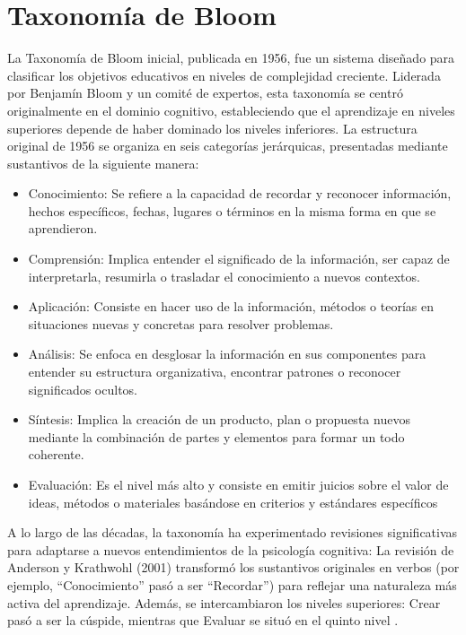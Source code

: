 \section{Taxonomía de Bloom}

La Taxonomía de Bloom inicial, publicada en 1956, fue un sistema diseñado para clasificar los objetivos educativos en niveles de complejidad creciente. Liderada por Benjamín Bloom y un comité de expertos, esta taxonomía se centró originalmente en el dominio cognitivo, estableciendo que el aprendizaje en niveles superiores depende de haber dominado los niveles inferiores.
La estructura original de 1956 se organiza en seis categorías jerárquicas, presentadas mediante sustantivos \cite{bloom1956} de la siguiente manera:
\begin{itemize}
    \item Conocimiento: Se refiere a la capacidad de recordar y reconocer información, hechos específicos, fechas, lugares o términos en la misma forma en que se aprendieron.
    \item Comprensión: Implica entender el significado de la información, ser capaz de interpretarla, resumirla o trasladar el conocimiento a nuevos contextos.
    \item Aplicación: Consiste en hacer uso de la información, métodos o teorías en situaciones nuevas y concretas para resolver problemas.
    \item Análisis: Se enfoca en desglosar la información en sus componentes para entender su estructura organizativa, encontrar patrones o reconocer significados ocultos.
    \item Síntesis: Implica la creación de un producto, plan o propuesta nuevos mediante la combinación de partes y elementos para formar un todo coherente.
    \item Evaluación: Es el nivel más alto y consiste en emitir juicios sobre el valor de ideas, métodos o materiales basándose en criterios y estándares específicos
\end{itemize}

 
A lo largo de las décadas, la taxonomía ha experimentado revisiones significativas para adaptarse a nuevos entendimientos de la psicología cognitiva:
La revisión de Anderson y Krathwohl (2001) transformó los sustantivos originales en verbos (por ejemplo, ``Conocimiento'' pasó a ser ``Recordar'') para reflejar una naturaleza más activa del aprendizaje. Además, se intercambiaron los niveles superiores: Crear pasó a ser la cúspide, mientras que Evaluar se situó en el quinto nivel \cite{anderson2001}. 

